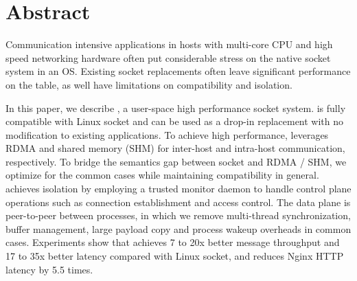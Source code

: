 \section*{Abstract}

Communication intensive applications in hosts with multi-core CPU and high speed networking hardware often put considerable stress on the native socket system in an OS. 
Existing socket replacements often leave significant performance on the table, as well have limitations on compatibility and isolation.



In this paper, we describe \sys, a user-space high performance socket system.
\sys is fully compatible with Linux socket and can be used as a drop-in replacement with no modification to existing applications.
To achieve high performance, \sys{} leverages RDMA and shared memory (SHM) for inter-host and intra-host communication, respectively.
To bridge the semantics gap between socket and RDMA / SHM, we optimize for the common cases while maintaining compatibility in general.
\sys achieves isolation by employing a trusted monitor daemon to handle control plane operations such as connection establishment and access control.
The data plane is peer-to-peer between processes, in which we remove multi-thread synchronization, buffer management, large payload copy and process wakeup overheads in common cases.
Experiments show that \sys achieves 7 to 20x better message throughput and 17 to 35x better latency compared with Linux socket, and reduces Nginx HTTP latency by 5.5 times.